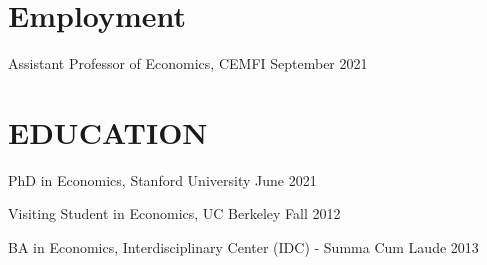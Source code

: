 \documentclass[margin]{res} %
\begin{document}
\begin{resume}


\section{Employment}

Assistant Professor of Economics, CEMFI \hfill September 2021


\section{EDUCATION}

PhD in Economics, Stanford University \hfill June 2021

Visiting Student in Economics, UC Berkeley  \hfill Fall 2012 

BA in Economics, Interdisciplinary Center (IDC) - Summa Cum Laude \hfill 2013

\begin{comment}
\section{DISSERTATION COMMITTEE}


\begin{multicols}{2}
	\begin{itemize}
		 \item[] Prof. Ran Abramitzky (Primary) \\
		Economics Department, Stanford University \\
		(650) 723-9276 \\
		\textcolor{blue}{ranabra@stanford.edu} \\

		 \item[] Asst. Prof. Petra Persson \\
		Economics Department, Stanford University \\
		(650) 723-4116 \\
		\textcolor{blue}{perssonp@stanford.edu} \\


\end{comment}
\end{resume}
\end{document}
